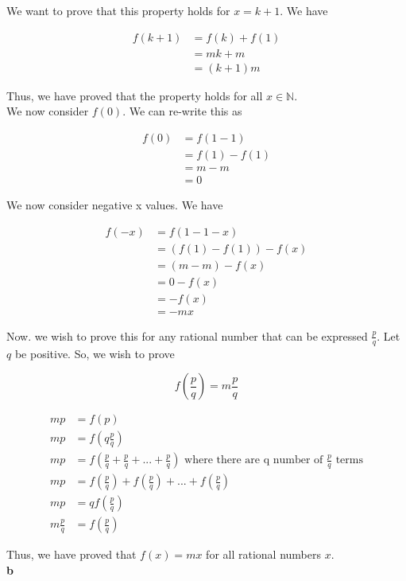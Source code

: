 \documentclass[addpoints]{exam}
\begin{document}
\begin{questions}
We want to prove that this property holds for $x = k + 1$. We have

\begin{align*}
    f(k + 1) &= f(k) + f(1)\\
    &= mk + m\\
    &= (k + 1)m
\end{align*}

Thus, we have proved that the property holds for all $x \in \mathbb{N}$.\\

We now consider $f(0)$. We can re-write this as 

\begin{align*}
    f(0) &= f(1 - 1)\\
    &= f(1) - f(1)\\
    &= m - m\\
    &= 0
\end{align*}

We now consider negative x values. We have

\begin{align*}
    f(-x) &= f(1 - 1 - x)\\
    &= (f(1) - f(1)) - f(x)\\
    &= (m - m) - f(x)\\
    &= 0 - f(x)\\
    &= -f(x)\\
    &= -mx
\end{align*}

Now. we wish to prove this for any rational number that can be expressed $\frac{p}{q}$. Let 
$q$ be positive. So, we wish to prove 

\[f(\frac{p}{q}) = m\frac{p}{q}\]

\begin{align*}
    mp &= f(p)\\
    mp &= f(q\frac{p}{q})\\
    mp &= f(\frac{p}{q} + \frac{p}{q} + ... + \frac{p}{q}) \text{ where there are q number of $\frac{p}{q}$ terms}\\
    mp &= f(\frac{p}{q}) + f(\frac{p}{q}) + ... + f(\frac{p}{q})\\
    mp &= qf(\frac{p}{q})\\ 
    m\frac{p}{q} &= f(\frac{p}{q})
\end{align*}

Thus, we have proved that $f(x) = mx$ for all rational numbers $x$.\\

\textbf{b}


\end{questions}
\end{document}
